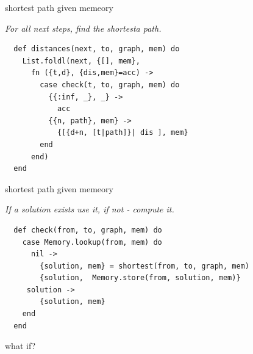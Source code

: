 \begin{frame}[fragile]{shortest path given memeory}

\pause\vspace{10pt}

{\em For all next steps, find the shortesta path.}

\pause\vspace{10pt}

\begin{verbatim}
  def distances(next, to, graph, mem) do
    List.foldl(next, {[], mem},
      fn ({t,d}, {dis,mem}=acc) ->
        case check(t, to, graph, mem) do
          {{:inf, _}, _} ->
            acc
          {{n, path}, mem} ->
            {[{d+n, [t|path]}| dis ], mem}
        end
      end)
  end
\end{verbatim}
\end{frame}

\begin{frame}[fragile]{shortest path given memeory}

{\em If a solution exists use it, if not - compute it.}

\begin{verbatim}
  def check(from, to, graph, mem) do
    case Memory.lookup(from, mem) do
      nil ->
        {solution, mem} = shortest(from, to, graph, mem)
        {solution,  Memory.store(from, solution, mem)}
     solution ->
        {solution, mem}
    end
  end
\end{verbatim}
\end{frame}



\begin{frame}{what if?}

\begin{figure}
\end{figure}

\end{frame}

